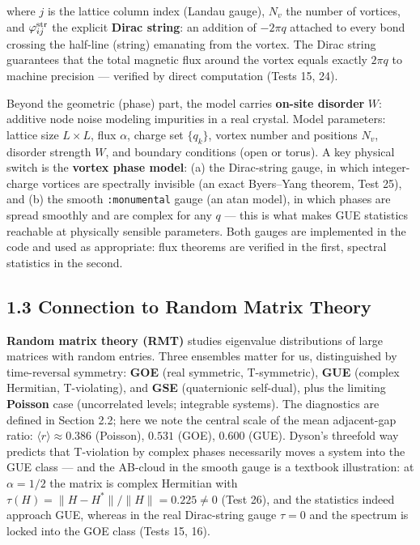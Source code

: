 \documentclass[
]{article}
\begin{document}
where \(j\) is the lattice column index (Landau gauge), \(N_v\) the
number of vortices, and \(\varphi^{\rm str}_{ij}\) the explicit
\textbf{Dirac string}: an addition of \(-2\pi q\) attached to every bond
crossing the half-line (string) emanating from the vortex. The Dirac
string guarantees that the total magnetic flux around the vortex equals
exactly \(2\pi q\) to machine precision --- verified by direct
computation (Tests 15, 24).

Beyond the geometric (phase) part, the model carries \textbf{on-site
disorder} \(W\): additive node noise modeling impurities in a real
crystal. Model parameters: lattice size \(L\times L\), flux \(\alpha\),
charge set \(\{q_k\}\), vortex number and positions \(N_v\), disorder
strength \(W\), and boundary conditions (open or torus). A key physical
switch is the \textbf{vortex phase model}: (a) the Dirac-string gauge,
in which integer-charge vortices are spectrally invisible (an exact
Byers--Yang theorem, Test 25), and (b) the smooth \texttt{:monumental}
gauge (an atan model), in which phases are spread smoothly and are
complex for any \(q\) --- this is what makes GUE statistics reachable at
physically sensible parameters. Both gauges are implemented in the code
and used as appropriate: flux theorems are verified in the first,
spectral statistics in the second.

\subsection{1.3 Connection to Random Matrix
Theory}\label{connection-to-random-matrix-theory}

\textbf{Random matrix theory (RMT)} studies eigenvalue distributions of
large matrices with random entries. Three ensembles matter for us,
distinguished by time-reversal symmetry: \textbf{GOE} (real symmetric,
T-symmetric), \textbf{GUE} (complex Hermitian, T-violating), and
\textbf{GSE} (quaternionic self-dual), plus the limiting
\textbf{Poisson} case (uncorrelated levels; integrable systems). The
diagnostics are defined in Section 2.2; here we note the central scale
of the mean adjacent-gap ratio: \(\langle r\rangle \approx 0.386\)
(Poisson), \(0.531\) (GOE), \(0.600\) (GUE). Dyson's threefold way
predicts that T-violation by complex phases necessarily moves a system
into the GUE class --- and the AB-cloud in the smooth gauge is a
textbook illustration: at \(\alpha = 1/2\) the matrix is complex
Hermitian with \(\tau(H) = \|H-H^*\|/\|H\| = 0.225 \neq 0\) (Test 26),
and the statistics indeed approach GUE, whereas in the real Dirac-string
gauge \(\tau = 0\) and the spectrum is locked into the GOE class (Tests
15, 16).
\end{document}
